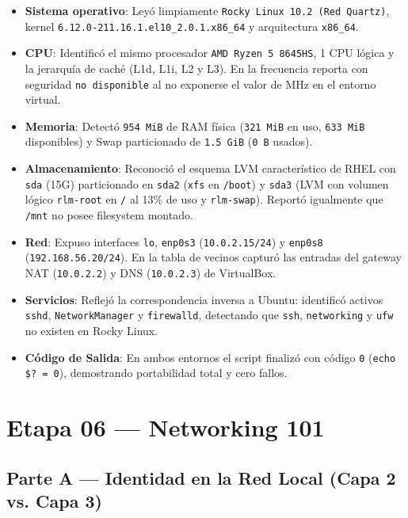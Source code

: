 \documentclass[11pt,a4paper]{article}
\begin{document}
\begin{itemize}[leftmargin=*, itemsep=1pt, topsep=1pt]
    \item \textbf{Sistema operativo}: Leyó limpiamente \texttt{Rocky Linux 10.2 (Red Quartz)}, kernel \texttt{6.12.0-211.16.1.el10\_2.0.1.x86\_64} y arquitectura \texttt{x86\_64}.
    \item \textbf{CPU}: Identificó el mismo procesador \texttt{AMD Ryzen 5 8645HS}, 1 CPU lógica y la jerarquía de caché (L1d, L1i, L2 y L3). En la frecuencia reporta con seguridad \texttt{no disponible} al no exponerse el valor de MHz en el entorno virtual.
    \item \textbf{Memoria}: Detectó \texttt{954 MiB} de RAM física (\texttt{321 MiB} en uso, \texttt{633 MiB} disponibles) y Swap particionado de \texttt{1.5 GiB} (\texttt{0 B} usados).
    \item \textbf{Almacenamiento}: Reconoció el esquema LVM característico de RHEL con \texttt{sda} (15G) particionado en \texttt{sda2} (\texttt{xfs} en \texttt{/boot}) y \texttt{sda3} (LVM con volumen lógico \texttt{rlm-root} en \texttt{/} al 13\% de uso y \texttt{rlm-swap}). Reportó igualmente que \texttt{/mnt} no posee filesystem montado.
    \item \textbf{Red}: Expuso interfaces \texttt{lo}, \texttt{enp0s3} (\texttt{10.0.2.15/24}) y \texttt{enp0s8} (\texttt{192.168.56.20/24}). En la tabla de vecinos capturó las entradas del gateway NAT (\texttt{10.0.2.2}) y DNS (\texttt{10.0.2.3}) de VirtualBox.
    \item \textbf{Servicios}: Reflejó la correspondencia inversa a Ubuntu: identificó activos \texttt{sshd}, \texttt{NetworkManager} y \texttt{firewalld}, detectando que \texttt{ssh}, \texttt{networking} y \texttt{ufw} no existen en Rocky Linux.
    \item \textbf{Código de Salida}: En ambos entornos el script finalizó con código \texttt{0} (\texttt{echo \$? = 0}), demostrando portabilidad total y cero fallos.
\end{itemize}

\clearpage
\section{Etapa 06 — Networking 101}

\subsection{Parte A — Identidad en la Red Local (Capa 2 vs. Capa 3)}
\end{document}

